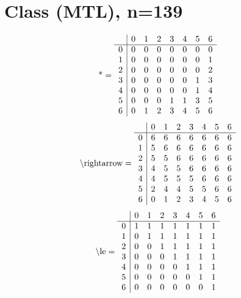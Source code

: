 \documentclass[11pt]{article}
\begin{document}
\section{Class (MTL), n=139}
\[\text{*} = 
\begin{array}{r | r r r r r r r}
 & 0 & 1 & 2 & 3 & 4 & 5 & 6 \\ \hline
0 & 0 & 0 & 0 & 0 & 0 & 0 & 0 \\
1 & 0 & 0 & 0 & 0 & 0 & 0 & 1 \\
2 & 0 & 0 & 0 & 0 & 0 & 0 & 2 \\
3 & 0 & 0 & 0 & 0 & 0 & 1 & 3 \\
4 & 0 & 0 & 0 & 0 & 0 & 1 & 4 \\
5 & 0 & 0 & 0 & 1 & 1 & 3 & 5 \\
6 & 0 & 1 & 2 & 3 & 4 & 5 & 6 \\
\end{array}
\]
\[\text{\textbackslash rightarrow} = 
\begin{array}{r | r r r r r r r}
 & 0 & 1 & 2 & 3 & 4 & 5 & 6 \\ \hline
0 & 6 & 6 & 6 & 6 & 6 & 6 & 6 \\
1 & 5 & 6 & 6 & 6 & 6 & 6 & 6 \\
2 & 5 & 5 & 6 & 6 & 6 & 6 & 6 \\
3 & 4 & 5 & 5 & 6 & 6 & 6 & 6 \\
4 & 4 & 5 & 5 & 5 & 6 & 6 & 6 \\
5 & 2 & 4 & 4 & 5 & 5 & 6 & 6 \\
6 & 0 & 1 & 2 & 3 & 4 & 5 & 6 \\
\end{array}
\]
\[\text{\textbackslash le} = 
\begin{array}{r | r r r r r r r}
 & 0 & 1 & 2 & 3 & 4 & 5 & 6 \\ \hline
0 & 1 & 1 & 1 & 1 & 1 & 1 & 1 \\
1 & 0 & 1 & 1 & 1 & 1 & 1 & 1 \\
2 & 0 & 0 & 1 & 1 & 1 & 1 & 1 \\
3 & 0 & 0 & 0 & 1 & 1 & 1 & 1 \\
4 & 0 & 0 & 0 & 0 & 1 & 1 & 1 \\
5 & 0 & 0 & 0 & 0 & 0 & 1 & 1 \\
6 & 0 & 0 & 0 & 0 & 0 & 0 & 1 \\
\end{array}
\]
\end{document}
